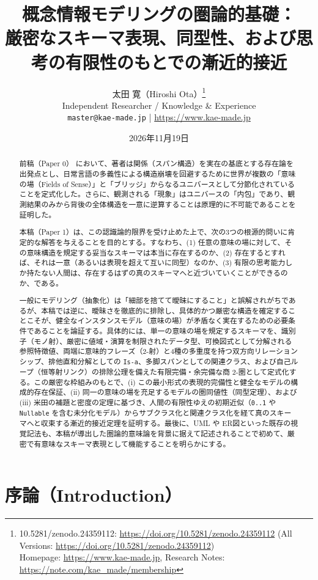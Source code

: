 \documentclass[11pt,a4paper]{ltjsarticle}
\title{\textbf{概念情報モデリングの圏論的基礎：\\
厳密なスキーマ表現、同型性、および思考の有限性のもとでの漸近的接近}}
\author{太田 寛（Hiroshi Ota）\thanks{10.5281/zenodo.24359112: \url{https://doi.org/10.5281/zenodo.24359112} (All Versions: \url{https://doi.org/10.5281/zenodo.24359112}) \\ Homepage: \url{https://www.kae-made.jp}, Research Notes: \url{https://note.com/kae_made/membership}} \\
\small Independent Researcher / Knowledge \& Experience\\
\small \texttt{master@kae-made.jp} \quad | \quad \url{https://www.kae-made.jp}}
\date{2026年11月19日}
\theoremstyle{definition}
\theoremstyle{plain}
\theoremstyle{remark}
\begin{document}
\maketitle

\begin{abstract}
前稿（Paper 0）\cite{ota2026paper0} において、著者は関係（スパン構造）を実在の基底とする存在論を出発点とし、日常言語の多義性による構造崩壊を回避するために世界が複数の「意味の場（Fields of Sense）」と「ブリッジ」からなるユニバースとして分節化されていることを定式化した。さらに、観測される「現象」はユニバースの「内包」であり、観測結果のみから背後の全体構造を一意に逆算することは原理的に不可能であることを証明した。

本稿（Paper 1）は、この認識論的限界を受け止めた上で、次の3つの根源的問いに肯定的な解答を与えることを目的とする。すなわち、(1) 任意の意味の場に対して、その意味構造を規定する妥当なスキーマは本当に存在するのか、(2) 存在するとすれば、それは一意（あるいは表現を超えて互いに同型）なのか、(3) 有限の思考能力しか持たない人間は、存在するはずの真のスキーマへと近づいていくことができるのか、である。

一般にモデリング（抽象化）は「細部を捨てて曖昧にすること」と誤解されがちであるが、本稿では逆に、曖昧さを徹底的に排除し、具体的かつ厳密な構造を確定することこそが、健全なインスタンスモデル（意味の場）が矛盾なく実在するための必要条件であることを論証する。具体的には、単一の意味の場を規定するスキーマを、識別子（モノ射）、厳密に値域・演算を制限されたデータ型、可換図式として分解される参照特徴値、両端に意味的フレーズ（2-射）と4種の多重度を持つ双方向リレーションシップ、排他直和分解としての \texttt{Is-a}、多脚スパンとしての関連クラス、および自己ループ（恒等射リンク）の排除公理を備えた有限完備・余完備な商 2-圏として定式化する。この厳密な枠組みのもとで、(i) この最小形式の表現的完備性と健全なモデルの構成的存在保証、(ii) 同一の意味の場を充足するモデルの圏同値性（同型定理）、および (iii) 米田の補題と密度の定理に基づき、人間の有限性ゆえの初期近似（\texttt{0..1} や \texttt{Nullable} を含む未分化モデル）からサブクラス化と関連クラス化を経て真のスキーマへと収束する漸近的接近定理を証明する。最後に、UML や ER図といった既存の視覚記法も、本稿が導出した圏論的意味論を背景に据えて記述されることで初めて、厳密で有意味なスキーマ表現として機能することを明らかにする。
\end{abstract}

\section{序論（Introduction）}
\end{document}

